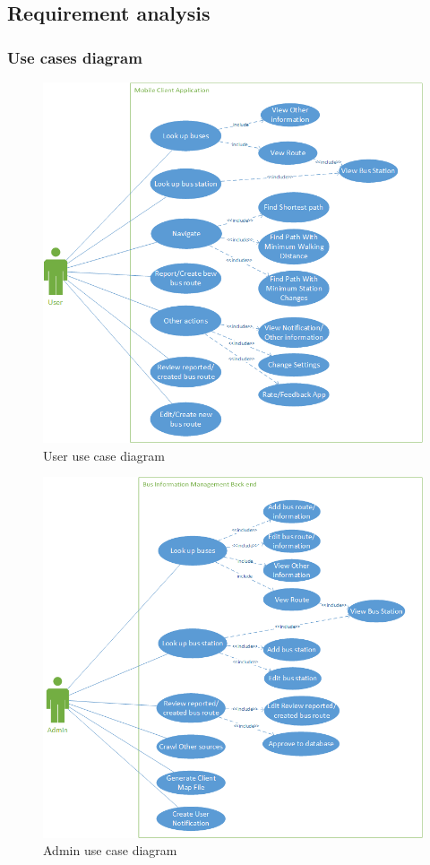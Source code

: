 \subsection{Requirement analysis}
	\subsubsection{Use cases diagram}
		\begin{figure}[H]
			\centering
			\includegraphics[scale=4]{Chapters/Fig/user-use-case.png}
			\caption{User use case diagram}
			\label{fig:user_use_case}
		\end{figure}

		\begin{figure}[H]
			\centering
			\includegraphics[scale=4]{Chapters/Fig/admin-use-case.png}
			\caption{Admin use case diagram}
			\label{fig:admin_use_case}
		\end{figure}


